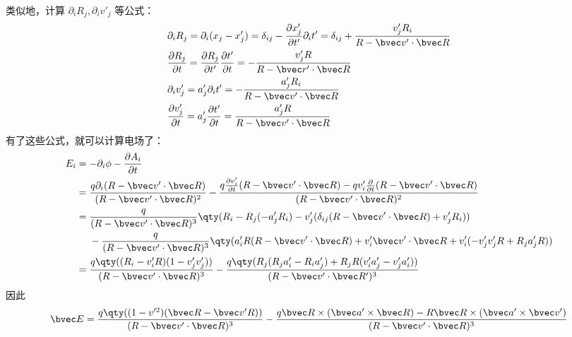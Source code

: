 类似地，计算 $\partial_i R_j,\partial_i v'_j$ 等公式：
\begin{equation}
\begin{aligned}
&\partial_i R_j=\partial_i(x_j-x_j')=\delta_{ij}-\frac{\partial x_j'}{\partial t'}\partial_i t'=\delta_{ij}+\frac{v'_jR_i}{R-\bvec v'\cdot \bvec R}
\\
&\frac{\partial R_j}{\partial t}=\frac{\partial R_j}{\partial t'}\frac{\partial t'}{\partial t}=-\frac{v'_jR}{R-\bvec r'\cdot \bvec R}
\\
&\partial_i v'_j=a'_j\partial_i t'=-\frac{a'_jR_i}{R-\bvec v'\cdot \bvec R}\\
&\frac{\partial v'_j}{\partial t}=a_j'\frac{\partial t'}{\partial t}=\frac{a_j'R}{R-\bvec v'\cdot \bvec R}
\end{aligned}
\end{equation}
有了这些公式，就可以计算电场了：
\begin{equation}
\begin{aligned}
E_i&=-\partial_i \phi - \frac{\partial A_i}{\partial t}
\\
&=\frac{q \partial_i (R-\bvec v'\cdot \bvec R)}{(R-\bvec v'\cdot \bvec R)^2}-\frac{q\frac{\partial v'_i}{\partial t}(R-\bvec v'\cdot \bvec R)-qv'_i\frac{\partial}{\partial t}(R-\bvec v'\cdot \bvec R)}{(R-\bvec v'\cdot \bvec R)^2}
\\
&=\frac{q}{(R-\bvec v'\cdot \bvec R)^3}\qty(R_i-R_j(-a_j'R_i)-v'_j(\delta_{ij}(R-\bvec v'\cdot \bvec R)+v'_jR_i))
\\
&\ \ \ \ -\frac{q}{(R-\bvec v'\cdot \bvec R)^3}\qty(a'_iR(R-\bvec v'\cdot \bvec R)+v'_i\bvec v'\cdot \bvec R+v'_i(-v'_jv'_jR+R_ja'_jR))
\\
&=\frac{q\qty((R_i-v_i'R)(1-v'_jv'_j))}{(R-\bvec v'\cdot \bvec R)^3}-\frac{q\qty(R_j(R_ja'_i-R_ia'_j)+R_jR(v'_ia'_j-v'_ja'_i))}{(R-\bvec v'\cdot \bvec R')^3}\\
\end{aligned}
\end{equation}
因此
\begin{equation}
\bvec E=\frac{q\qty((1-v'^2)(\bvec R-\bvec v'R))}{(R-\bvec v'\cdot \bvec R)^3}-\frac{q\bvec R\times (\bvec a'\times \bvec R)-R \bvec R\times (\bvec a'\times \bvec v')}{(R-\bvec v'\cdot \bvec R)^3}
\end{equation}